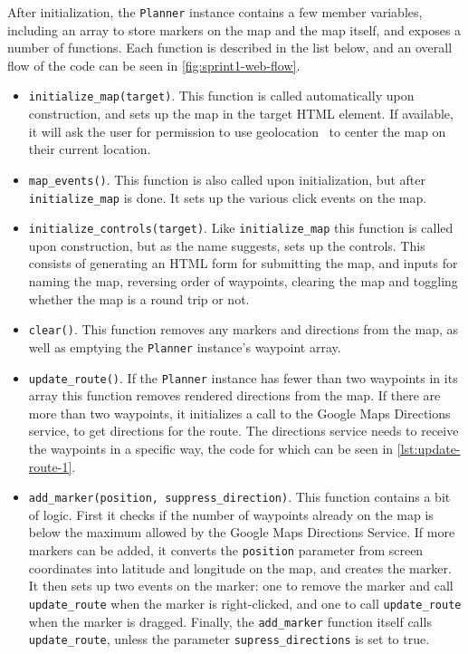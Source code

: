 After initialization, the \texttt{Planner} instance contains a few member variables, including an array to store markers on the map and the map itself, and exposes a number of functions. Each function is described in the list below, and an overall flow of the code can be seen in \autoref{fig:sprint1-web-flow}.

\begin{itemize}
	\item{\texttt{initialize\_map(target)}. This function is called automatically upon construction, and sets up the map in the target \ac{HTML} element. If available, it will ask the user for permission to use geolocation~\citep{geolocation} to center the map on their current location.}
	\item{\texttt{map\_events()}. This function is also called upon initialization, but after \texttt{initialize\_map} is done. It sets up the various click events on the map.}
	\item{\texttt{initialize\_controls(target)}. Like \texttt{initialize\_map} this function is called upon construction, but as the name suggests, sets up the controls. This consists of generating an \ac{HTML} form for submitting the map, and inputs for naming the map, reversing order of waypoints, clearing the map and toggling whether the map is a round trip or not.}
	\item{\texttt{clear()}. This function removes any markers and directions from the map, as well as emptying the \texttt{Planner} instance's waypoint array.}
	\item{\texttt{update\_route()}. If the \texttt{Planner} instance has fewer than two waypoints in its array this function removes rendered directions from the map. If there are more than two waypoints, it initializes a call to the Google Maps Directions service, to get directions for the route. The directions service needs to receive the waypoints in a specific way, the code for which can be seen in \autoref{lst:update-route-1}.}
	\item{\texttt{add\_marker(position, suppress\_direction)}. This function contains a bit of logic. First it checks if the number of waypoints already on the map is below the maximum allowed by the Google Maps Directions Service. If more markers can be added, it converts the \texttt{position} parameter from screen coordinates into latitude and longitude on the map, and creates the marker. It then sets up two events on the marker: one to remove the marker and call \texttt{update\_route} when the marker is right-clicked, and one to call \texttt{update\_route} when the marker is dragged. Finally, the \texttt{add\_marker} function itself calls \texttt{update\_route}, unless the parameter \texttt{supress\_directions} is set to true.}

\end{itemize}
